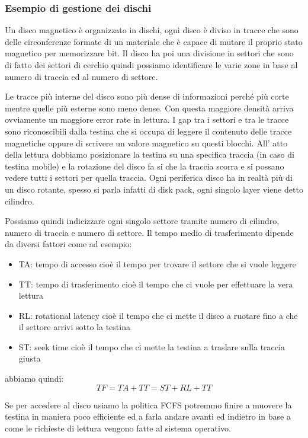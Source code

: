 \subsubsection{Esempio di gestione dei dischi}
Un disco magnetico è organizzato in dischi, ogni disco è diviso in tracce che sono delle circonferenze formate di un materiale che è capace di mutare il proprio stato magnetico per memorizzare bit.
Il disco ha poi una divisione in settori che sono di fatto dei settori di cerchio quindi possiamo identificare le varie zone in base al numero di traccia ed al numero di settore.

Le tracce più interne del disco sono più dense di informazioni perché più corte mentre quelle più esterne sono meno dense.
Con questa maggiore densità arriva ovviamente un maggiore error rate in lettura.
I gap tra i settori e tra le tracce sono riconoscibili dalla testina che si occupa di leggere il contenuto delle tracce magnetiche oppure di scrivere un valore magnetico su questi blocchi.
All' atto della lettura dobbiamo posizionare la testina su una specifica traccia (in caso di testina mobile) e la rotazione del disco fa si che la traccia scorra e si possano vedere tutti i settori per quella traccia.
Ogni periferica disco ha in realtà più di un disco rotante, spesso si parla infatti di disk pack, ogni singolo layer viene detto cilindro.

Possiamo quindi indicizzare ogni singolo settore tramite numero di cilindro, numero di traccia e numero di settore.
Il tempo medio di trasferimento dipende da diversi fattori come ad esempio:
\begin{itemize}
    \item TA: tempo di accesso cioè il tempo per trovare il settore che si vuole leggere
    \item TT: tempo di trasferimento cioè il tempo che ci vuole per effettuare la vera lettura
    \item RL: rotational latency cioè il tempo che ci mette il disco a ruotare fino a che il settore arrivi sotto la testina
    \item ST: seek time cioè il tempo che ci mette la testina a traslare sulla traccia giusta
\end{itemize}
abbiamo quindi:
$$ TF = TA + TT = ST + RL + TT $$

Se per accedere al disco usiamo la politica FCFS potremmo finire a muovere la testina in maniera poco efficiente ed a farla andare avanti ed indietro in base a come le richieste di lettura vengono fatte al sistema operativo.

